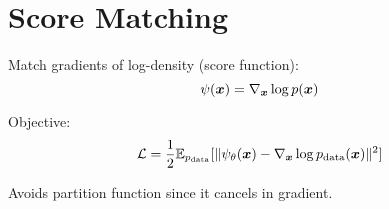 
\section{Score Matching }
\label{sec:score-matching}

Match gradients of log-density (score function):
\begin{equation}
\psi(\boldsymbol{x}) = \nabla_{\boldsymbol{x}} \log p(\boldsymbol{x})
\end{equation}

Objective:
\begin{equation}
\mathcal{L} = \frac{1}{2} \mathbb{E}_{p_{\text{data}}}[\|\psi_{\theta}(\boldsymbol{x}) - \nabla_{\boldsymbol{x}} \log p_{\text{data}}(\boldsymbol{x})\|^2]
\end{equation}

Avoids partition function since it cancels in gradient.




